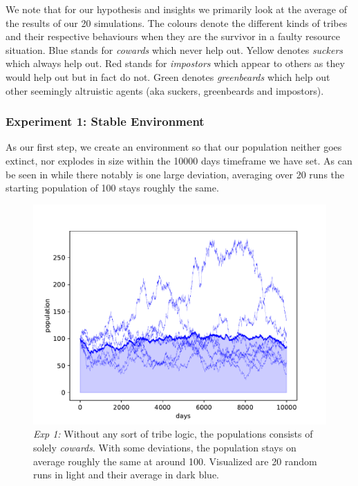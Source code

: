 \documentclass[sigconf]{acmart}
\newcommand{\VNumSimulations}{20\xspace}
\newcommand{\VNumDays}{10000\xspace}
\newcommand{\VNumPop}{100\xspace}
\newcommand{\cowards}{\textit{cowards}\xspace}
\newcommand{\suckers}{\textit{suckers}\xspace}
\newcommand{\impostors}{\textit{impostors}\xspace}
\newcommand{\greenbeards}{\textit{greenbeards}\xspace}
\begin{document}
    We note that for our hypothesis and insights we primarily look at the average of the results of our \VNumSimulations simulations.
    The colours denote the different kinds of tribes and their respective behaviours when they are the survivor in a faulty resource situation.
    Blue stands for \cowards which never help out.
    Yellow denotes \suckers which always help out.
    Red stands for \impostors which appear to others as they would help out but in fact do not.
    Green denotes \greenbeards which help out other seemingly altruistic agents (aka suckers, greenbeards and impostors).

    \subsubsection*{Experiment 1: Stable Environment}
    As our first step, we create an environment so that our population neither goes extinct, nor explodes in size within the \VNumDays days timeframe we have set.
    As can be seen in  while there notably is one large deviation, averaging over \VNumSimulations runs the starting population of 100 stays roughly the same.

    \begin{figure}
        \includegraphics[width=\columnwidth]{figures/stable_population}
        \caption{\textit{Exp 1:} Without any sort of tribe logic, the populations consists of solely \cowards.
        With some deviations, the population stays on average roughly the same at around \VNumPop.
        Visualized are \VNumSimulations random runs in light and their average in dark blue. }
        \label{fig:stable_pop}
    \end{figure}
\end{document}
